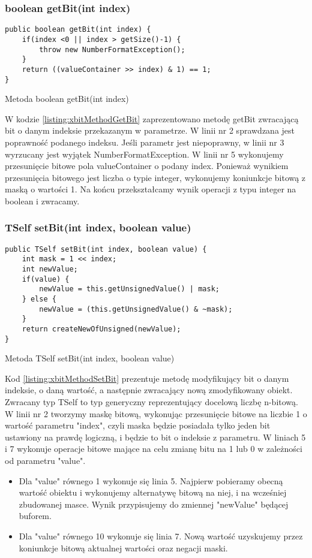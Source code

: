 	\subsubsection{boolean getBit(int index)}
	
	\begin{listing}[h]
		\begin{verbatim}
public boolean getBit(int index) {
	if(index <0 || index > getSize()-1) {
		throw new NumberFormatException();
	}
	return ((valueContainer >> index) & 1) == 1;
}
		\end{verbatim}
		\caption{Metoda boolean getBit(int index)}
		\label{listing:xbitMethodGetBit}
	\end{listing}
	W kodzie \ref{listing:xbitMethodGetBit} zaprezentowano metodę getBit zwracającą bit o danym indeksie przekazanym w parametrze. W linii nr 2 sprawdzana jest poprawność podanego indeksu. Jeśli parametr jest niepoprawny, w linii nr 3 wyrzucany jest wyjątek NumberFormatException. W linii nr 5 wykonujemy przesunięcie bitowe pola valueContainer o podany index. Ponieważ wynikiem przesunięcia bitowego jest liczba o typie integer, wykonujemy koniunkcje bitową z maską o wartości 1. Na końcu przekształcamy wynik operacji z typu integer na boolean i zwracamy.
	
	\subsubsection{TSelf setBit(int index, boolean value)}
	\begin{listing}[h]
		\begin{verbatim}
public TSelf setBit(int index, boolean value) {
	int mask = 1 << index;
	int newValue;
	if(value) {
		newValue = this.getUnsignedValue() | mask;
	} else {
		newValue = (this.getUnsignedValue() & ~mask);
	}
	return createNewOfUnsigned(newValue);
}
		\end{verbatim}
		\caption{Metoda TSelf setBit(int index, boolean value)}
		\label{listing:xbitMethodSetBit}
	\end{listing}	
	Kod \ref{listing:xbitMethodSetBit} prezentuje metodę modyfikujący bit o danym indeksie, o daną wartość, a następnie zwracający nową zmodyfikowany obiekt. Zwracany typ TSelf to typ generyczny reprezentujący docelową liczbę n-bitową. W linii nr 2 tworzymy maskę bitową, wykonując przesunięcie bitowe na liczbie 1 o wartość parametru "index", czyli maska będzie posiadała tylko jeden bit ustawiony na prawdę logiczną, i będzie to bit o indeksie z parametru. W liniach 5 i 7 wykonuje operacje bitowe mające na celu zmianę bitu na 1 lub 0 w zależności od parametru "value". 
	\begin{itemize}  
		\item Dla "value" równego 1 wykonuje się linia 5. Najpierw pobieramy obecną wartość obiektu i wykonujemy alternatywę bitową na niej, i na wcześniej zbudowanej masce. Wynik przypisujemy do zmiennej "newValue" będącej buforem.
		\item Dla "value" równego 10 wykonuje się linia 7. Nową wartość uzyskujemy przez koniunkcje bitową aktualnej wartości oraz negacji maski. 
	\end{itemize} 
	

